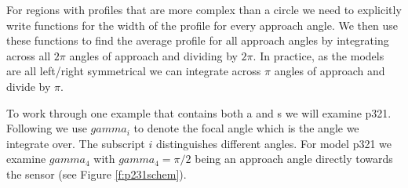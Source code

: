 \documentclass[a4paper,10pt,reqno,oneside]{amsart}
\begin{document}
For regions with profiles that are more complex than a circle we need to explicitly write functions for the width of the profile for every approach angle. We then use these functions to find the average profile for all approach angles by integrating across all $2\pi$ angles of approach and dividing by $2\pi$. In practice, as the models are all left/right symmetrical we can integrate across $\pi$ angles of approach and divide by $\pi$.

To work through one example that contains both a and s we will examine p321. Following \citep{Rowcliffe2008estimating} we use $gamma_i$ to denote the focal angle which is the angle we integrate over. The subscript $i$ distinguishes different angles. For model p321 we examine $ gamma_4$ with  $ gamma_4 = \pi/2$ being an approach angle directly towards the sensor (see Figure \ref{f:p231schem}).
\end{document}
